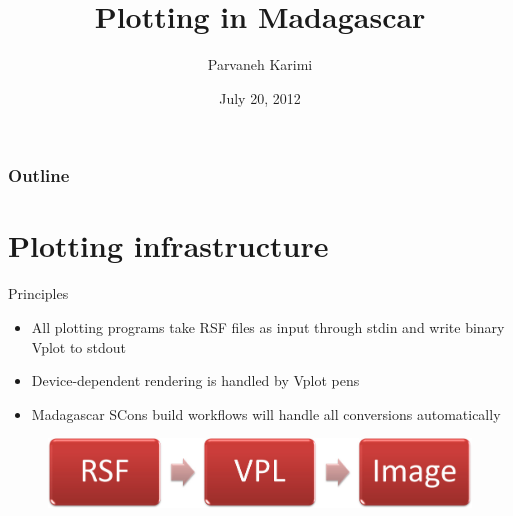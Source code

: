 \newcommand{\sconscode}[3]
{
  \begin{block}{}
  
  \end{block}
}

%
%
\title[]{Plotting in Madagascar}

\author[Karimi]{Parvaneh Karimi}
\date[Madagascar school in Austin] %
{July 20, 2012}

\begin{frame}
  \titlepage
  \appendix
\end{frame}

\begin{frame}
  \frametitle{Outline}
   \hspace*{2cm}
   \begin{minipage}[t][3cm]{10cm}
    \tableofcontents
   \end{minipage}
\end{frame}

\section{Plotting infrastructure}

\begin{frame}
  \begin{block}{Principles}
    \begin{itemize}
      \item All plotting programs take RSF files as input through stdin and write binary Vplot to stdout
      \item Device-dependent rendering is handled by Vplot pens
      \item Madagascar SCons build workflows will handle all conversions automatically
    \end{itemize}
  \end{block}
  \begin{figure}
  \includegraphics[scale=0.45]{Fig/RSF.pdf}
  \end{figure}
\end{frame}

